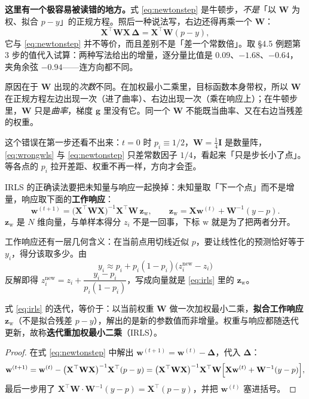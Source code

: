 \documentclass[11pt,a4paper,fontset=windows,zihao=-4]{ctexart}
\newcommand{\bX}{\mathbf{X}}
\newcommand{\bw}{\mathbf{w}}
\newcommand{\bz}{\mathbf{z}}
\newcommand{\bg}{\mathbf{g}}
\newcommand{\bI}{\mathbf{I}}
\newcommand{\bW}{\mathbf{W}}
\newcommand{\bDelta}{\boldsymbol{\Delta}}
\newcommand{\tp}{^{\top}}
\begin{document}
\textbf{这里有一个极容易被读错的地方。}式 \eqref{eq:newtonstep} 是牛顿步，\emph{不是}「以 $\bW$ 为权、拟合 $p-y$」的正规方程。照后一种说法写，右边还得再乘一个 $\bW$：
\begin{equation}
  \bX\tp\bW\bX\,\bDelta=\bX\tp\bW(p-y),
  \label{eq:wrongwls}
\end{equation}
它与 \eqref{eq:newtonstep} 并不等价，而且差别不是「差一个常数倍」。取 \S4.5 例题第 3 步的值代入试算：两种写法给出的增量，逐分量比值是 $0.09$、$-1.68$、$-0.64$，夹角余弦 $-0.94$——连方向都不同。

原因在于 $\bW$ 出现的\emph{次数}不同。在加权最小二乘里，目标函数本身带权，所以 $\bW$ 在正规方程左边出现一次（进了曲率）、右边出现一次（乘在响应上）；在牛顿步里，$\bW$ 只是\emph{曲率}，梯度 $\bg$ 里没有它。同一个 $\bW$ 不能既当曲率、又在右边当残差的权重。

这个错误在第一步还看不出来：$t=0$ 时 $p_i\equiv1/2$，$\bW=\tfrac14\bI$ 是数量阵，\eqref{eq:wrongwls} 与 \eqref{eq:newtonstep} 只差常数因子 $1/4$，看起来「只是步长小了点」。等各点的 $p_i$ 拉开差距、权重不再一样，方向才会歪。

IRLS 的正确读法要把未知量与响应一起换掉：未知量取「下一个点」而不是增量，响应取下面的\textbf{工作响应}：
\begin{equation}
  \bw^{(t+1)}=\bigl(\bX\tp\bW\bX\bigr)^{-1}\bX\tp\bW\,\bz_{\mathrm w},
  \qquad
  \bz_{\mathrm w}=\bX\bw^{(t)}+\bW^{-1}(y-p).
  \label{eq:irls}
\end{equation}
$\bz_{\mathrm w}$ 是 $N$ 维向量，与单样本得分 $z_i$ 不是一回事，下标 $\mathrm w$ 就是为了把两者分开。

工作响应还有一层几何含义：在当前点用切线近似 $p$，要让线性化的预测恰好等于 $y_i$，得分该取多少。由
\[
  y_i\approx p_i+p_i(1-p_i)\bigl(z_i^{\mathrm{new}}-z_i\bigr)
\]
反解即得 $z_i^{\mathrm{new}}=z_i+\dfrac{y_i-p_i}{p_i(1-p_i)}$，写成向量就是 \eqref{eq:irls} 里的 $\bz_{\mathrm w}$。

\begin{prop}
式 \eqref{eq:irls} 的迭代，等价于：以当前权重 $\bW$ 做一次加权最小二乘，\textbf{拟合工作响应 $\bz_{\mathrm w}$}（不是拟合残差 $p-y$），解出的是新的参数值而非增量。权重与响应都随迭代更新，故称\textbf{迭代重加权最小二乘}（IRLS）。
\end{prop}

\begin{proof}
在式 \eqref{eq:newtonstep} 中解出 $\bw^{(t+1)}=\bw^{(t)}-\bDelta$，代入 $\bDelta$：
\[
  \bw^{(t+1)}=\bw^{(t)}-\bigl(\bX\tp\bW\bX\bigr)^{-1}\bX\tp(p-y)
  =\bigl(\bX\tp\bW\bX\bigr)^{-1}\bX\tp\bW\Bigl[\bX\bw^{(t)}+\bW^{-1}(y-p)\Bigr],
\]
最后一步用了 $\bX\tp\bW\cdot\bW^{-1}(y-p)=\bX\tp(p-y)$，并把 $\bw^{(t)}$ 塞进括号。
\end{proof}
\end{document}
